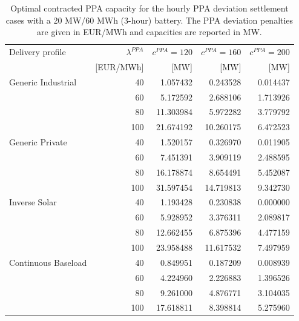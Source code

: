 \begin{table}[H]
\centering
\small
\setlength{\tabcolsep}{5pt}
\caption{Optimal contracted PPA capacity for the hourly PPA deviation settlement cases with a 20 MW/60 MWh (3-hour) battery. The PPA deviation penalties are given in EUR/MWh and capacities are reported in MW.}
\label{tab:hourly_supply_curve_exact_values}
\begin{tabular*}{\textwidth}{@{\extracolsep{\fill}}lrrrr@{}}
\toprule
Delivery profile & $\lambda^{PPA}$ & $c^{PPA}=120$ & $c^{PPA}=160$ & $c^{PPA}=200$ \\
 & [EUR/MWh] & [MW] & [MW] & [MW] \\
\midrule
Generic Industrial & 40 & 1.057432 & 0.243528 & 0.014437 \\
 & 60 & 5.172592 & 2.688106 & 1.713926 \\
 & 80 & 11.303984 & 5.972282 & 3.779792 \\
 & 100 & 21.674192 & 10.260175 & 6.472523 \\
\addlinespace
Generic Private & 40 & 1.520157 & 0.326970 & 0.011905 \\
 & 60 & 7.451391 & 3.909119 & 2.488595 \\
 & 80 & 16.178874 & 8.654491 & 5.452087 \\
 & 100 & 31.597454 & 14.719813 & 9.342730 \\
\addlinespace
Inverse Solar & 40 & 1.193428 & 0.230838 & 0.000000 \\
 & 60 & 5.928952 & 3.376311 & 2.089817 \\
 & 80 & 12.662455 & 6.875396 & 4.477159 \\
 & 100 & 23.958488 & 11.617532 & 7.497959 \\
\addlinespace
Continuous Baseload & 40 & 0.849951 & 0.187209 & 0.008939 \\
 & 60 & 4.224960 & 2.226883 & 1.396526 \\
 & 80 & 9.261000 & 4.876771 & 3.104035 \\
 & 100 & 17.618811 & 8.398814 & 5.275960 \\
\bottomrule
\end{tabular*}
\end{table}

